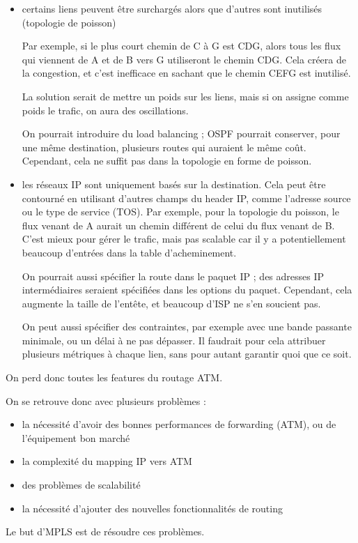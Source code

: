 			\begin{itemize}
				\item certains liens peuvent être surchargés alors que d'autres sont inutilisés (topologie de poisson)
				
				
				Par exemple, si le plus court chemin de C à G est CDG, alors tous les flux qui viennent de A et de B vers G utiliseront le chemin CDG. Cela créera de la congestion, et c'est inefficace en sachant que le chemin CEFG est inutilisé.
				
				La solution serait de mettre un poids sur les liens, mais si on assigne comme poids le trafic, on aura des oscillations.
				
				On pourrait introduire du load balancing ; OSPF pourrait conserver, pour une même destination, plusieurs routes qui auraient le même coût. Cependant, cela ne suffit pas dans la topologie en forme de poisson.
				
				
					
				\item les réseaux IP sont uniquement basés sur la destination. Cela peut être contourné en utilisant d'autres champs du header IP, comme l'adresse source ou le type de service (TOS). Par exemple, pour la topologie du poisson, le flux venant de A aurait un chemin différent de celui du flux venant de B.				
				C'est mieux pour gérer le trafic, mais pas scalable car il y a potentiellement beaucoup d'entrées dans la table d'acheminement.
		
		
				On pourrait aussi spécifier la route dans le paquet IP ; des adresses IP intermédiaires seraient spécifiées dans les options du paquet. Cependant, cela augmente la taille de l'entête, et beaucoup d'ISP ne s'en soucient pas.
		
				On peut aussi spécifier des contraintes, par exemple avec une bande passante minimale, ou un délai à ne pas dépasser. Il faudrait pour cela attribuer plusieurs métriques à chaque lien, sans pour autant garantir quoi que ce soit.
			\end{itemize}
	
			On perd donc toutes les features du routage ATM.
			
			On se retrouve donc avec plusieurs problèmes :
			
			\begin{itemize}
				\item la nécessité d'avoir des bonnes performances de forwarding (ATM), ou de l'équipement bon marché
				\item la complexité du mapping IP vers ATM
				\item des problèmes de scalabilité
				\item la nécessité d'ajouter des nouvelles fonctionnalités de routing
			\end{itemize}
			
			Le but d'MPLS est de résoudre ces problèmes.
			